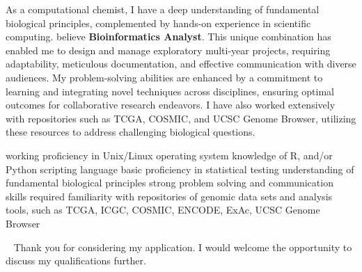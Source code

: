 \documentclass[11pt, a4paper]{awesome-cv}
\newcommand{\role}{Bioinformatics Analyst}
\newcommand{\brole}{\textbf{\role}}
\begin{document}
\begin{cvletter}
		As a computational chemist, I 		have a deep understanding of fundamental biological principles, complemented by hands-on experience in scientific computing. 
		believe \brole.
		This unique combination has enabled me to design and manage exploratory multi-year projects, requiring adaptability, meticulous documentation, 
		and effective communication with diverse audiences. My problem-solving abilities are enhanced by a commitment to learning and integrating novel techniques across disciplines, ensuring optimal outcomes for collaborative research endeavors.
		I have also worked extensively with repositories such as TCGA, COSMIC, and UCSC Genome Browser, utilizing these resources to address challenging biological questions.
		
		
		working proficiency in Unix/Linux operating system
		knowledge of R, and/or Python scripting language
		basic proficiency in statistical testing
		understanding of fundamental biological principles
		strong problem solving and communication skills required
		familiarity with repositories of genomic data sets and analysis tools, such as TCGA, ICGC, COSMIC, ENCODE, ExAc, UCSC Genome Browser
		
		
		
		
	\end{cvletter}
	~\newline
	Thank you for considering my application. I would welcome the opportunity to discuss my qualifications further. \\
	\newline
	~\newline
	\makeletterclosing	
\end{document}
